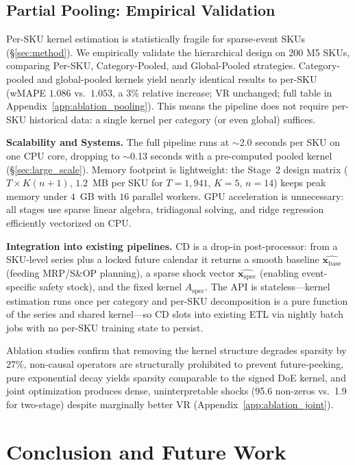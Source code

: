 \documentclass[10pt]{article} %
\theoremstyle{plain}
\theoremstyle{definition}
\newcommand{\xbase}{\mathbf{x}_{\text{base}}}
\newcommand{\xspec}{\mathbf{x}_{\text{spec}}}
\newcommand{\Aspec}{A_{\text{spec}}}
\begin{document}
\subsection{Partial Pooling: Empirical Validation}
\label{sec:partial_pooling_exp}

Per-SKU kernel estimation is statistically fragile for sparse-event SKUs (\S\ref{sec:method}). We empirically validate the hierarchical design on 200 M5 SKUs, comparing Per-SKU, Category-Pooled, and Global-Pooled strategies. Category-pooled and global-pooled kernels yield nearly identical results to per-SKU (wMAPE $1.086$ vs.~$1.053$, a $3\%$ relative increase; VR unchanged; full table in Appendix~\ref{app:ablation_pooling}). This means the pipeline does not require per-SKU historical data: a single kernel per category (or even global) suffices.

\textbf{Scalability and Systems.} The full pipeline runs at $\sim$2.0 seconds per SKU on one CPU core, dropping to $\sim$0.13 seconds with a pre-computed pooled kernel (\S\ref{sec:large_scale}). Memory footprint is lightweight: the Stage~2 design matrix ($T \times K(n+1)$, $1.2$~MB per SKU for $T=1{,}941$, $K=5$, $n=14$) keeps peak memory under $4$~GB with $16$ parallel workers. GPU acceleration is unnecessary: all stages use sparse linear algebra, tridiagonal solving, and ridge regression efficiently vectorized on CPU.

\textbf{Integration into existing pipelines.} CD is a drop-in post-processor: from a SKU-level series plus a locked future calendar it returns a smooth baseline $\hat{\xbase}$ (feeding MRP/S\&OP planning), a sparse shock vector $\hat{\xspec}$ (enabling event-specific safety stock), and the fixed kernel $\Aspec$. The API is stateless---kernel estimation runs once per category and per-SKU decomposition is a pure function of the series and shared kernel---so CD slots into existing ETL via nightly batch jobs with no per-SKU training state to persist.

Ablation studies confirm that removing the kernel structure degrades sparsity by 27\%, non-causal operators are structurally prohibited to prevent future-peeking, pure exponential decay yields sparsity comparable to the signed DoE kernel, and joint optimization produces dense, uninterpretable shocks (95.6 non-zeros vs.~1.9 for two-stage) despite marginally better VR (Appendix~\ref{app:ablation_joint}).


\section{Conclusion and Future Work}
\end{document}
